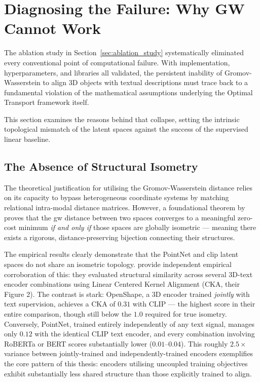 \section{Diagnosing the Failure: Why GW Cannot Work}
\label{sec:why_gw_fails}

The ablation study in Section~\ref{sec:ablation_study} systematically eliminated every conventional point of computational failure. With implementation, hyperparameters, and libraries all validated, the persistent inability of Gromov-Wasserstein to align 3D objects with textual descriptions must trace back to a fundamental violation of the mathematical assumptions underlying the Optimal Transport framework itself.

This section examines the reasons behind that collapse, setting the intrinsic topological mismatch of the latent spaces against the success of the supervised linear baseline.

\subsection{The Absence of Structural Isometry}
\label{subsec:isometry_bottleneck}

The theoretical justification for utilising the Gromov-Wasserstein distance relies on its capacity to bypass heterogeneous coordinate systems by matching relational intra-modal distance matrices. However, a foundational theorem by \textcite{vayer2019optimal} proves that the \gls{gw} distance between two spaces converges to a meaningful zero-cost minimum \textit{if and only if} those spaces are globally isometric --- meaning there exists a rigorous, distance-preserving bijection connecting their structures.

The empirical results clearly demonstrate that the PointNet and \gls{clip} latent spaces do not share an isometric topology. \textcite{hadgi2025escaping} provide independent empirical corroboration of this: they evaluated structural similarity across several 3D-text encoder combinations using Linear Centered Kernel Alignment (CKA, their Figure 2). The contrast is stark: OpenShape, a 3D encoder trained \emph{jointly} with text supervision, achieves a CKA of $0.31$ with CLIP --- the highest score in their entire comparison, though still below the $1.0$ required for true isometry. Conversely, PointNet, trained entirely independently of any text signal, manages only $0.12$ with the identical CLIP text encoder, and every combination involving RoBERTa or BERT scores substantially lower ($0.01$--$0.04$). This roughly $2.5\times$ variance between jointly-trained and independently-trained encoders exemplifies the core pattern of this thesis: encoders utilising uncoupled training objectives exhibit substantially less shared structure than those explicitly trained to align.

